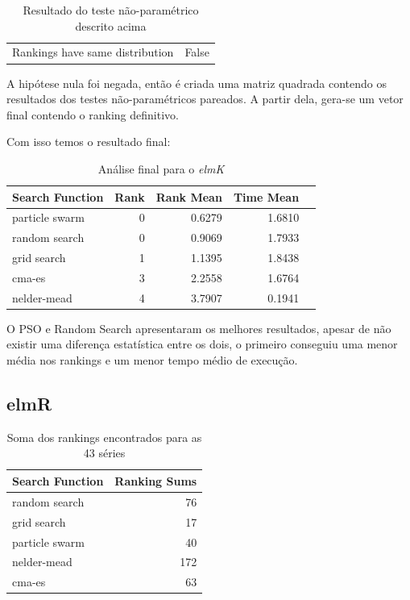 \documentclass[preprint,12pt]{elsarticle}
\begin{document}
\begin{table}[h]
	\centering
	\begin{tabular}{l r}
		
		Rankings have same distribution  &  False \\
		
	\end{tabular}
	\caption{Resultado do teste não-paramétrico descrito acima}
\end{table}

A hipótese nula foi negada, então é criada uma matriz quadrada contendo os resultados dos testes não-paramétricos pareados. A partir dela, gera-se um vetor final contendo o ranking definitivo.

Com isso temos o resultado final:


\begin{table}[h]
	\centering
	\begin{tabular}{lrrrr}
		\hline
		Search Function   &   Rank &   Rank Mean &      Time Mean \\
		\hline
		particle swarm    &      0 &    0.6279 &       1.6810  \\
		random search     &      0 &    0.9069 &       1.7933  \\
		grid search       &      1 &    1.1395  &       1.8438  \\
		cma-es            &      3 &    2.2558  &      1.6764  \\
		nelder-mead       &      4 &    3.7907   &     0.1941 \\
		\hline
	\end{tabular}
	
	\caption{Análise final para o \textit{elmK}}
\end{table}

O PSO e Random Search apresentaram os melhores resultados, apesar de não existir uma diferença estatística entre os dois, o primeiro conseguiu uma menor média nos rankings e um menor tempo médio de execução.


\subsection{elmR}

\begin{table}[h]
	\centering
	\begin{tabular}{lr}
		\hline
		Search Function   &   Ranking Sums \\
		\hline
		random search     &             76 \\
		grid search       &             17 \\
		particle swarm    &             40 \\
		nelder-mead       &            172 \\
		cma-es            &             63 \\
		\hline
	\end{tabular}
	
	\caption{Soma dos rankings encontrados para as 43 séries}
\end{table}
\end{document}
